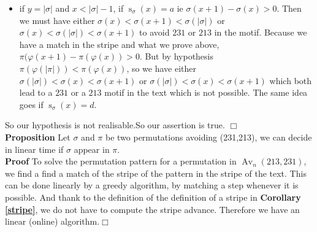 \documentclass[a4paper]{llncs}
\DeclareMathOperator{\Avd}{Av}
\newcommand\Av[2]{\Avd_{{#1}}({#2})}
\newcommand{\ptext}{\pi}
\newcommand{\pmotif}{\sigma}
\DeclareMathOperator{\stripea}{s}
\newcommand{\stripe}[2]{\stripea_{{#1}}({#2})}
\newcounter{num}
\newcommand{\num}{\stepcounter{num} }
\newcommand{\dstep}{d}
\newcommand{\ustep}{a}
\begin{document}
\begin{itemize}
			\item if $y = |\pmotif|$ and $x<|\pmotif|-1$,
			if $\stripe{\pmotif}{x}=\ustep$ ie
			$\pmotif(x+1)-\pmotif(x)>0$. Then
			we must have either
			$\pmotif(x)<\pmotif(x+1)<\pmotif(|\pmotif|)$
			or $\pmotif(x)<\pmotif(|\pmotif|)<\pmotif(x+1)$ 
			to avoid $231$ or $213$ in the motif.
			Because we have a match in the stripe
			and what we prove above,
			$\ptext(\varphi(x+1)-\ptext(\varphi(x))>0$.
			But by hypothesis $\ptext(\varphi(|\ptext|))<\ptext(\varphi(x))$,
			so we have either 		
			$\pmotif(|\pmotif|)<\pmotif(x)<\pmotif(x+1)$
			or $\pmotif(|\pmotif|)<\pmotif(x)<\pmotif(x+1)$ 
			which both lead to a $231$ or a $213$ motif
			in the text which is not possible.
			The same idea goes if $\stripe{\pmotif}{x}=\dstep$. 			
			
		\end{itemize}
		So our hypothesis is not realisable.So our assertion is true. $\Box$\\
		
		\textbf{Proposition  \num \thenum} Let $\pmotif$ and $\ptext$
		be two permutations avoiding (231,213), 
		we can decide in linear time if $\pmotif$ 
		appear in $\ptext$.\\	
		
		\textbf{Proof}	
		To solve the permutation pattern for a permutation in $\Av{n}{213,231}$, 
		we find a find a match of the stripe of the pattern in the stripe of the text.
		This can be done linearly by a greedy algorithm, 
		by matching a step whenever it is possible.
		And thank to the definition of the definition of a stripe in \textbf{Corollary \ref{stripe}},
		we do not have to compute the stripe advance.
		Therefore we have an linear (online) algorithm.$\Box$\\
				

		
\end{document}
